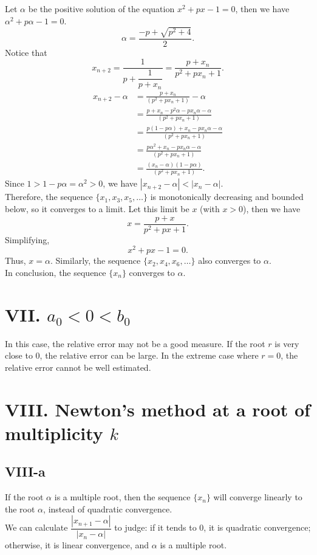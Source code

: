 \documentclass[a4paper]{article}
\begin{document}
Let $\alpha$ be the positive solution of the equation $x^2 + px - 1 = 0$, then we have $\alpha^2 + p\alpha - 1 = 0$.\\
\[
\alpha =  \frac{-p + \sqrt{p^2+4}}{2}.
\]
Notice that
\[
x_{n+2} = \frac{1}{p + \dfrac{1}{p + x_n}}= \frac{p + x_n}{p^2 + px_n + 1}.
\]
\begin{align*}
  x_{n+2} - \alpha &= \frac{p + x_n}{\left(p^2 + px_n + 1\right)} - \alpha \\
  &= \frac{p + x_n - p^2\alpha - px_n\alpha - \alpha}{\left(p^2 + px_n + 1\right)}\\
  &= \frac{p(1 - p\alpha) + x_n - px_n\alpha - \alpha}{\left(p^2 + px_n + 1\right)}\\
  &= \frac{p\alpha^2 + x_n - px_n\alpha - \alpha}{\left(p^2 + px_n + 1\right)}\\
  &= \frac{(x_n - \alpha)(1 - p\alpha)}{\left(p^2 + px_n + 1\right)}.
\end{align*}
Since $1 > 1 - p\alpha = \alpha^2 > 0$, we have $|x_{n+2} - \alpha| < |x_n - \alpha|$.\\
Therefore, the sequence $\{x_1, x_3, x_5, \dots\}$ is monotonically decreasing and bounded below, so it converges to a limit. Let this limit be $x$ (with $x > 0$), then we have
\[
  x = \frac{p + x}{p^2 + px + 1}.
\]
Simplifying,
\[
  x^2 + px - 1 = 0.
\]
Thus, $x = \alpha$. Similarly, the sequence $\{x_2, x_4, x_6, \dots\}$ also converges to $\alpha$.\\
In conclusion, the sequence $\{x_n\}$ converges to $\alpha$.

\section*{VII. $a_0 < 0 < b_0$}

In this case, the relative error may not be a good measure. If the root $r$ is very close to 0, the relative error can be large. In the extreme case where $r = 0$, the relative error cannot be well estimated.

\section*{VIII. Newton's method at a root of multiplicity $k$}

\subsection*{VIII-a}
If the root $\alpha$ is a multiple root, then the sequence $\{x_n\}$ will converge linearly to the root $\alpha$, instead of quadratic convergence.\\
We can calculate $\dfrac{|x_{n+1} - \alpha|}{|x_n - \alpha|}$ to judge: if it tends to 0, it is quadratic convergence; otherwise, it is linear convergence, and $\alpha$ is a multiple root.
\end{document}

